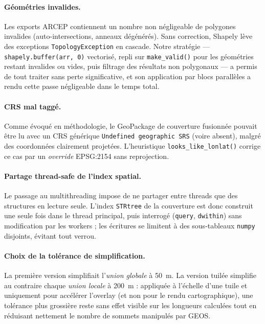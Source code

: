 \documentclass[11pt,a4paper]{article}
\begin{document}
\paragraph{Géométries invalides.} Les exports ARCEP contiennent un nombre non négligeable de polygones invalides (auto-intersections, anneaux dégénérés). Sans correction, Shapely lève des exceptions \texttt{TopologyException} en cascade. Notre stratégie — \texttt{shapely.buffer(arr, 0)} vectorisé, repli sur \texttt{make\_valid()} pour les géométries restant invalides ou vides, puis filtrage des résultats non polygonaux — a permis de tout traiter sans perte significative, et son application par blocs parallèles a rendu cette passe négligeable dans le temps total.

\paragraph{CRS mal taggé.} Comme évoqué en méthodologie, le GeoPackage de couverture fusionnée pouvait être lu avec un CRS générique \texttt{Undefined geographic SRS} (voire absent), malgré des coordonnées clairement projetées. L'heuristique \texttt{looks\_like\_lonlat()} corrige ce cas par un \emph{override} EPSG:2154 sans reprojection.

\paragraph{Partage thread-safe de l'index spatial.} Le passage au multithreading impose de ne partager entre threads que des structures en lecture seule. L'index \texttt{STRtree} de la couverture est donc construit une seule fois dans le thread principal, puis interrogé (\texttt{query}, \texttt{dwithin}) sans modification par les workers ; les écritures se limitent à des sous-tableaux \texttt{numpy} disjoints, évitant tout verrou.

\paragraph{Choix de la tolérance de simplification.} La première version simplifiait l'\emph{union globale} à 50~m. La version tuilée simplifie au contraire chaque \emph{union locale} à 200~m : appliquée à l'échelle d'une tuile et uniquement pour accélérer l'overlay (et non pour le rendu cartographique), une tolérance plus grossière reste sans effet visible sur les longueurs calculées tout en réduisant nettement le nombre de sommets manipulés par GEOS.
\end{document}
